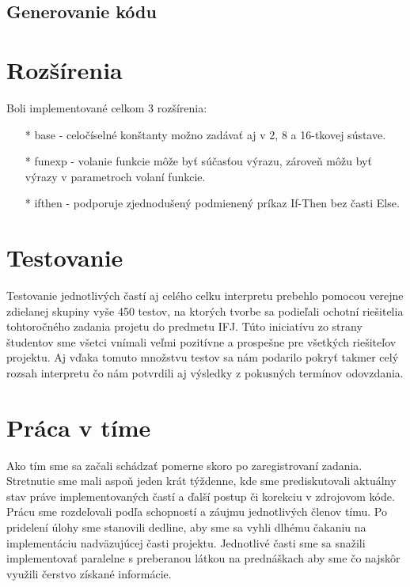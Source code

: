 \documentclass{article}
\begin{document}
        \subsection{Generovanie kódu}
        
    \section{Rozšírenia}
    Boli implementované celkom 3 rozšírenia:
        \begin{itemize}
            \item[*] base - celočíselné konštanty možno zadávať aj v 2, 8 a 16-tkovej sústave.
            \item[*] funexp - volanie funkcie môže byť súčasťou výrazu, zároveň môžu byť výrazy
            v parametroch volaní funkcie.
            \item[*] ifthen - podporuje zjednodušený podmienený príkaz If-Then bez časti Else.
        \end{itemize}
    
    \section{Testovanie}
    Testovanie jednotlivých častí aj celého celku interpretu prebehlo pomocou verejne zdielanej 
    skupiny vyše 450 testov, na ktorých tvorbe sa podieľali ochotní riešitelia tohtoročného 
    zadania projetu do predmetu IFJ. Túto iniciatívu zo strany študentov sme všetci vnímali
    veľmi pozitívne a prospešne pre všetkých riešiteľov projektu. Aj vďaka tomuto množstvu 
    testov sa nám podarilo pokryť takmer celý rozsah interpretu čo nám potvrdili aj výsledky
    z pokusných termínov odovzdania.
    
    \section{Práca v tíme}
    Ako tím sme sa začali schádzať pomerne skoro po zaregistrovaní zadania. Stretnutie sme mali aspoň
    jeden krát týždenne, kde sme prediskutovali aktuálny stav práve implementovaných častí a ďalší 
    postup či korekciu v zdrojovom kóde. Prácu sme rozdeľovali podľa schopností a záujmu jednotlivých
    členov tímu. Po pridelení úlohy sme stanovili dedline, aby sme sa vyhli dlhému čakaniu na 
    implementáciu nadväzujúcej časti projektu. Jednotlivé časti sme sa snažili implementovať paralelne
    s preberanou látkou na prednáškach aby sme čo najskôr využili čerstvo získané informácie.
\end{document}
